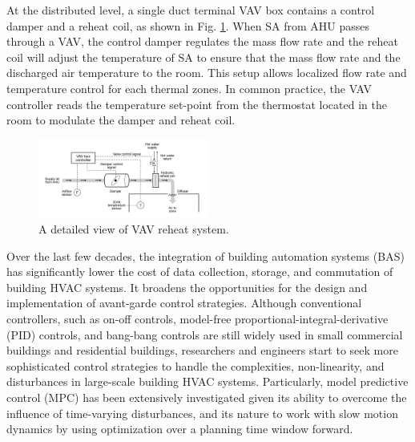 \documentclass[conference]{IEEEtran}
\begin{document}
At the distributed level, a single duct terminal VAV box contains a control damper and a reheat coil, as shown in Fig. \ref{fig2}. When SA from AHU passes through a VAV, the control damper regulates the mass flow rate and the reheat coil will adjust the temperature of SA to ensure that the mass flow rate and the discharged air temperature to the room. This setup allows localized flow rate and temperature control for each thermal zones. In common practice, the VAV controller reads the temperature set-point from the thermostat located in the room to modulate the damper and reheat coil.

\begin{figure}[htbp]
\centerline{\includegraphics[width=0.5\textwidth]{Figures/VAV.jpeg}}
\caption{A detailed view of VAV reheat system.}
\label{fig2}
\end{figure}

Over the last few decades, the integration of building automation systems (BAS) has significantly lower the cost of data collection, storage, and commutation of building HVAC systems. It broadens the opportunities for the design and implementation of avant-garde control strategies. Although conventional controllers, such as on-off controls, model-free proportional-integral-derivative (PID) controls, and bang-bang controls are still widely used in small commercial buildings and residential buildings, researchers and engineers start to seek more sophisticated control strategies to handle the complexities, non-linearity, and disturbances in large-scale building HVAC systems. Particularly, model predictive control (MPC) has been extensively investigated given its ability to overcome the influence of time-varying disturbances, and its nature to work with slow motion dynamics by using optimization over a planning time window forward.
\end{document}
